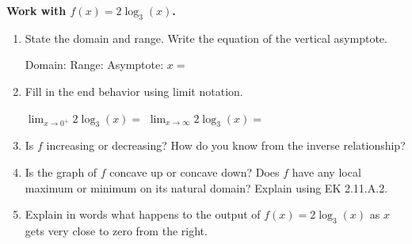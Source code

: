 \documentclass[10pt]{article}
\begin{document}
\vspace{0.08in}

\begin{tcolorbox}[colback=white, colframe=black!40,
    title=\textbf{Tier A --- Approaching Proficiency},
    fonttitle=\bfseries, arc=2mm, left=3mm, right=3mm, top=2mm, bottom=2mm]

\textbf{Work with $f(x) = 2\log_3(x)$.}

\begin{enumerate}[leftmargin=1.8em, itemsep=10pt]

\item State the domain and range. Write the equation of the vertical asymptote.

\vspace{4pt}
Domain: \blank{3.5cm} \quad Range: \blank{3.5cm} \quad Asymptote: $x = $ \blank{1.5cm}

\item Fill in the end behavior using limit notation.

\vspace{4pt}
$\displaystyle\lim_{x \to 0^+} 2\log_3(x) = $ \blank{2.5cm} \qquad
$\displaystyle\lim_{x \to \infty} 2\log_3(x) = $ \blank{2.5cm}

\item Is $f$ increasing or decreasing? How do you know from the inverse relationship?


\item Is the graph of $f$ concave up or concave down? Does $f$ have any local maximum or
      minimum on its natural domain? Explain using EK 2.11.A.2.


\item Explain in words what happens to the output of $f(x) = 2\log_3(x)$ as $x$ gets
      very close to zero from the right.


\end{enumerate}
\end{tcolorbox}

\vspace{0.08in}
\end{document}
